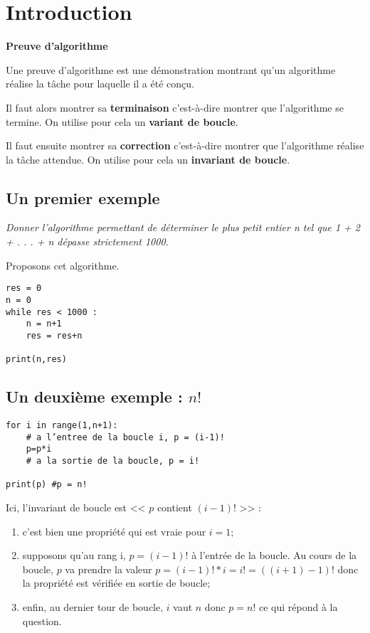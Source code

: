 \section{Introduction}
\begin{defi} 
\textbf{\textsf{Preuve d'algorithme}}

Une preuve d'algorithme est une démonstration montrant qu'un algorithme réalise la tâche pour laquelle il a été conçu. 

Il faut alors montrer sa \textbf{terminaison} c'est-à-dire montrer que l'algorithme se termine. On utilise pour cela un \textbf{variant de boucle}.

Il faut ensuite montrer sa \textbf{correction} c'est-à-dire montrer que l'algorithme réalise la tâche attendue. On utilise pour cela un \textbf{invariant de boucle}.
\end{defi}



\subsection{Un premier exemple}

\textit{Donner l'algorithme permettant de déterminer le plus petit entier n tel que 1 + 2 + . . . + n dépasse strictement 1000.}

Proposons cet algorithme.
\begin{lstlisting}
res = 0
n = 0
while res < 1000 : 
    n = n+1
    res = res+n

print(n,res)
\end{lstlisting}

\subsection{Un deuxième exemple : $n!$}

\begin{lstlisting}
for i in range(1,n+1):
    # a l’entree de la boucle i, p = (i-1)!
    p=p*i
    # a la sortie de la boucle, p = i!

print(p) #p = n!
\end{lstlisting}

Ici, l'invariant de boucle est << $p$ contient $(i-1)!$ >> : 
\begin{enumerate}
\item c'est bien une propriété qui est vraie pour $i=1$;
\item supposons qu'au rang i, $p=(i-1)!$ à l'entrée de la boucle. Au cours de la boucle, $p$ va prendre la valeur $p=(i-1)!*i=i!=((i+1)-1)!$ donc la propriété est vérifiée en sortie de boucle;
\item enfin, au dernier tour de boucle, $i$ vaut $n$ donc $p=n!$ ce qui répond à la question.\\
\end{enumerate}

